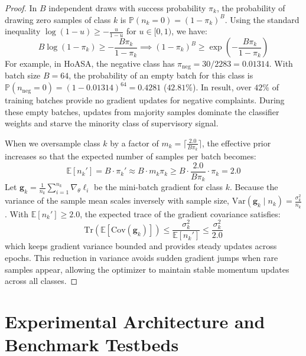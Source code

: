 \documentclass[10pt,journal,compsoc]{IEEEtran}
\begin{document}
\begin{proof}
In $B$ independent draws with success probability $\pi_k$, the probability of drawing zero samples of class $k$ is $\mathbb{P}(n_k = 0) = (1 - \pi_k)^B$. Using the standard inequality $\log(1 - u) \ge -\frac{u}{1-u}$ for $u \in [0, 1)$, we have:
\begin{equation}
    B \log(1 - \pi_k) \ge -\frac{B \pi_k}{1 - \pi_k} \implies (1 - \pi_k)^B \ge \exp\left(-\frac{B \pi_k}{1 - \pi_k}\right)
\end{equation}
For example, in HoASA, the negative class has $\pi_{\text{neg}} = 30/2283 = 0.01314$. With batch size $B=64$, the probability of an empty batch for this class is $\mathbb{P}(n_{\text{neg}} = 0) = (1 - 0.01314)^{64} = 0.4281$ ($42.81\%$). In result, over $42\%$ of training batches provide no gradient updates for negative complaints. During these empty batches, updates from majority samples dominate the classifier weights and starve the minority class of supervisory signal.

When we oversample class $k$ by a factor of $m_k = \lceil \frac{2.0}{B \pi_k} \rceil$, the effective prior increases so that the expected number of samples per batch becomes:
\begin{equation}
    \mathbb{E}[n_k'] = B \cdot \pi_k' \approx B \cdot m_k \pi_k \ge B \cdot \frac{2.0}{B \pi_k} \cdot \pi_k = 2.0
\end{equation}
Let $\mathbf{g}_k = \frac{1}{n_k} \sum_{i=1}^{n_k} \nabla_\theta \ell_i$ be the mini-batch gradient for class $k$. Because the variance of the sample mean scales inversely with sample size, $\text{Var}(\mathbf{g}_k \mid n_k) = \frac{\sigma_k^2}{n_k}$. With $\mathbb{E}[n_k'] \ge 2.0$, the expected trace of the gradient covariance satisfies:
\begin{equation}
    \text{Tr}\left(\mathbb{E}[\text{Cov}(\mathbf{g}_k)]\right) \le \frac{\sigma_k^2}{\mathbb{E}[n_k']} \le \frac{\sigma_k^2}{2.0}
\end{equation}
which keeps gradient variance bounded and provides steady updates across epochs. This reduction in variance avoids sudden gradient jumps when rare samples appear, allowing the optimizer to maintain stable momentum updates across all classes.
\end{proof}

\section{Experimental Architecture and Benchmark Testbeds}
\label{sec:experiments}
\end{document}
